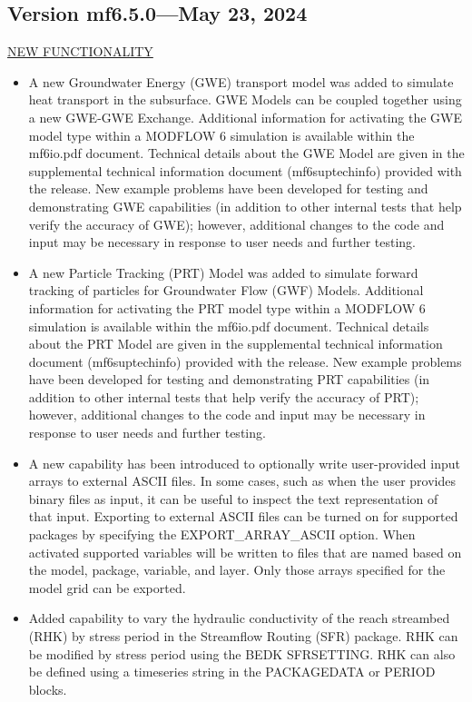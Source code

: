 	
	\subsection{Version mf6.5.0---May 23, 2024}
	
	\underline{NEW FUNCTIONALITY}
	\begin{itemize}
		\item A new Groundwater Energy (GWE) transport model was added to simulate heat transport in the subsurface.  GWE Models can be coupled together using a new GWE-GWE Exchange.  Additional information for activating the GWE model type within a MODFLOW 6 simulation is available within the mf6io.pdf document.  Technical details about the GWE Model are given in the supplemental technical information document (mf6suptechinfo) provided with the release.  New example problems have been developed for testing and demonstrating GWE capabilities (in addition to other internal tests that help verify the accuracy of GWE); however, additional changes to the code and input may be necessary in response to user needs and further testing.
		\item A new Particle Tracking (PRT) Model was added to simulate forward tracking of particles for Groundwater Flow (GWF) Models.  Additional information for activating the PRT model type within a MODFLOW 6 simulation is available within the mf6io.pdf document.  Technical details about the PRT Model are given in the supplemental technical information document (mf6suptechinfo) provided with the release. New example problems have been developed for testing and demonstrating PRT capabilities (in addition to other internal tests that help verify the accuracy of PRT); however, additional changes to the code and input may be necessary in response to user needs and further testing.
		\item A new capability has been introduced to optionally write user-provided input arrays to external ASCII files.  In some cases, such as when the user provides binary files as input, it can be useful to inspect the text representation of that input.  Exporting to external ASCII files can be turned on for supported packages by specifying the EXPORT\_ARRAY\_ASCII option.  When activated supported variables will be written to files that are named based on the model, package, variable, and layer.  Only those arrays specified for the model grid can be exported.
		\item Added capability to vary the hydraulic conductivity of the reach streambed (RHK) by stress period in the Streamflow Routing (SFR) package. RHK can be modified by stress period using the BEDK SFRSETTING. RHK can also be defined using a timeseries string in the PACKAGEDATA or PERIOD blocks.

\end{itemize}
